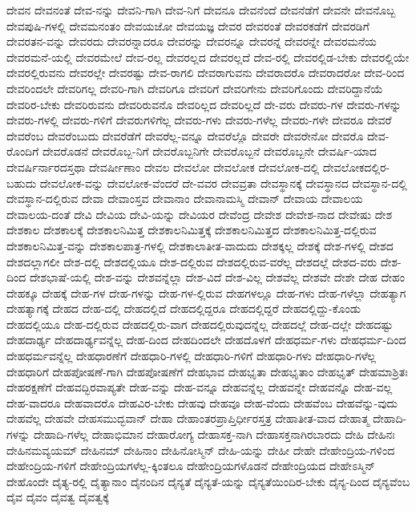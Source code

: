 {ದೇವನ
ದೇವನಂತೆ
ದೇವ-ನನ್ನು
ದೇವನಿ-ಗಾಗಿ
ದೇವ-ನಿಗೆ
ದೇವನೂ
ದೇವನೆಂದೆ
ದೇವನೆಡೆಗೆ
ದೇವನೇ
ದೇವನೊಬ್ಬ
ದೇವಪುಷಿ-ಗಳಲ್ಲಿ
ದೇವಮನಂತಂ
ದೇವಯಜೋ
ದೇವಯಜ್ಞ
ದೇವರ
ದೇವರಂತೆ
ದೇವರಕಡೆಗೆ
ದೇವರಡಿಗೆ
ದೇವರತನ-ವನ್ನು
ದೇವರದು
ದೇವರನ್ನಾದರೂ
ದೇವರನ್ನು
ದೇವರನ್ನೂ
ದೇವರನ್ನೆ
ದೇವರನ್ನೇ
ದೇವರಮನೆಯ
ದೇವರಮನೆ-ಯಲ್ಲಿ
ದೇವರಮೇಲೆ
ದೇವ-ರಲ್ಲ
ದೇವರಲ್ಲದ
ದೇವರಲ್ಲದೆ
ದೇವ-ರಲ್ಲಿ
ದೇವರಲ್ಲಿಡ-ಬೇಕು
ದೇವರಲ್ಲಿಯೇ
ದೇವರಲ್ಲಿರುವನು
ದೇವರಲ್ಲೇ
ದೇವರಷ್ಟು
ದೇವ-ರಾಗಲಿ
ದೇವರಾಗುವನು
ದೇವರಾದರೊ
ದೇವರಾದರೋ
ದೇವ-ರಿಂದ
ದೇವರಿಂದಲೇ
ದೇವರಿಗಲ್ಲ
ದೇವರಿ-ಗಾಗಿ
ದೇವರಿಗೂ
ದೇವರಿಗೆ
ದೇವರಿಗೇನು
ದೇವರಿಗೊಂದು
ದೇವರಿದ್ದಾನೆಯೆ
ದೇವರಿರ-ಬೇಕು
ದೇವರಿರುವನು
ದೇವರಿರುವನೊ
ದೇವರಿಲ್ಲದ
ದೇವರಿಲ್ಲದೆ
ದೇ-ವರು
ದೇವರು-ಗಳ
ದೇವರು-ಗಳನ್ನು
ದೇವರು-ಗಳಲ್ಲಿ
ದೇವರು-ಗಳಿಗೆ
ದೇವರುಗಳಿಗೆಲ್ಲ
ದೇವರು-ಗಳು
ದೇವರು-ಗಳೆಲ್ಲ
ದೇವರು-ಗಳೇ
ದೇವರೂ
ದೇವರೆ
ದೇವರೆಂಬ
ದೇವರೆಂಬುದು
ದೇವರೆಡೆಗೆ
ದೇವರೆಲ್ಲ-ವನ್ನೂ
ದೇವರೆಲ್ಲೊ
ದೇವರೇ
ದೇವರೇನೋ
ದೇವರೊ
ದೇವ-ರೊಂದಿಗೆ
ದೇವರೊಡನೆ
ದೇವರೊಬ್ಬ-ನಿಗೆ
ದೇವರೊಬ್ಬನಿಗೇ
ದೇವರೊಬ್ಬನೆ
ದೇವರೊಬ್ಬನೇ
ದೇವರ್ಷಿ-ಯಾದ
ದೇವರ್ಷಿರ್ನಾರದಸ್ತಥಾ
ದೇವರ್ಷೀಣಾಂ
ದೇವಲ
ದೇವಲೋ
ದೇವಲೋಕ
ದೇವಲೋಕ-ದಲ್ಲಿ
ದೇವಲೋಕದಲ್ಲಿರ-ಬಹುದು
ದೇವಲೋಕ-ವನ್ನು
ದೇವಲೋಕ-ವೆಂದರೆ
ದೇ-ವವರ
ದೇವವ್ರತಾ
ದೇವಸ್ಥಾನಕ್ಕೆ
ದೇವಸ್ಥಾನದ
ದೇವಸ್ಥಾನ-ದಲ್ಲಿ
ದೇವಸ್ಥಾನ-ದಲ್ಲಿರುವ
ದೇವಾ
ದೇವಾಂಸ್ತವ
ದೇವಾನಾಂ
ದೇವಾನಾಮಸ್ಮಿ
ದೇವಾನ್
ದೇವಾಯ
ದೇವಾಲಯ
ದೇವಾಲಯ-ದಂತೆ
ದೇವಿ
ದೇವಿಯ
ದೇವಿ-ಯನ್ನು
ದೇವಿಯರ
ದೇವೆಂದ್ರ
ದೇವೇಶ
ದೇವೇಶ-ನಾದ
ದೇವೇಷು
ದೇಶ
ದೇಶಕಾಲ
ದೇಶಕಾಲಕ್ಕೆ
ದೇಶಕಾಲನಿಮಿತ್ತ
ದೇಶಕಾಲನಿಮಿತ್ತಕ್ಕೆ
ದೇಶಕಾಲನಿಮಿತ್ತದ
ದೇಶಕಾಲನಿಮಿತ್ತ-ದಲ್ಲಿರುವ
ದೇಶಕಾಲನಿಮಿತ್ತ-ವನ್ನು
ದೇಶಕಾಲಪಾತ್ರ-ಗಳಲ್ಲಿ
ದೇಶಕಾಲಾತೀತ-ವಾದುದು
ದೇಶಕ್ಕಲ್ಲ
ದೇಶಕ್ಕೆ
ದೇಶ-ಗಳಲ್ಲಿ
ದೇಶದ
ದೇಶದಲ್ಲಾಗಲೀ
ದೇಶ-ದಲ್ಲಿ
ದೇಶದಲ್ಲಿಯೂ
ದೇಶ-ದಲ್ಲಿರುವ
ದೇಶದಲ್ಲಿರುವ-ವರೆಲ್ಲ
ದೇಶದಲ್ಲೆ
ದೇಶದ-ವರು
ದೇಶ-ದಿಂದ
ದೇಶಭಾಷೆ-ಯಲ್ಲಿ
ದೇಶ-ವನ್ನು
ದೇಶವನ್ನೆಲ್ಲಾ
ದೇಶ-ವಿದೆ
ದೇಶ-ವಿಲ್ಲ
ದೇಶವೆಲ್ಲ
ದೇಶವೇ
ದೇಶೇ
ದೇಹ
ದೇಹಂ
ದೇಹಕ್ಕೂ
ದೇಹಕ್ಕೆ
ದೇಹ-ಗಳ
ದೇಹ-ಗಳನ್ನು
ದೇಹ-ಗಳ-ಲ್ಲಿರುವ
ದೇಹಗಳಲ್ಲೂ
ದೇಹ-ಗಳು
ದೇಹ-ಗಳೆಲ್ಲಾ
ದೇಹತ್ಯಾಗ
ದೇಹತ್ಯಾಗಕ್ಕೆ
ದೇಹದ
ದೇಹ-ದಲ್ಲಿ
ದೇಹದಲ್ಲಿದೆ
ದೇಹದಲ್ಲಿದ್ದರೂ
ದೇಹದಲ್ಲಿದ್ದರೆ
ದೇಹದಲ್ಲಿದ್ದು-ಕೊಂಡು
ದೇಹದಲ್ಲಿಯೂ
ದೇಹ-ದಲ್ಲಿರುವ
ದೇಹದಲ್ಲಿರು-ವಾಗ
ದೇಹದಲ್ಲಿರುವುದನ್ನೆಲ್ಲ
ದೇಹದಲ್ಲೆ
ದೇಹ-ದಲ್ಲೇ
ದೇಹದಷ್ಟು
ದೇಹದಾರ್ಢ್ಯ
ದೇಹದಾರ್ಢ್ಯವನ್ನೆಲ್ಲ
ದೇಹ-ದಿಂದ
ದೇಹದಿಂದಲೇ
ದೇಹದೊಳಗೆ
ದೇಹಧರ್ಮ-ಗಳು
ದೇಹಧರ್ಮ-ದಿಂದ
ದೇಹಧರ್ಮವನ್ನೆಲ್ಲ
ದೇಹಧಾರಣೆಗೆ
ದೇಹಧಾರಿ-ಗಳಲ್ಲಿ
ದೇಹಧಾರಿ-ಗಳಿಗೆ
ದೇಹಧಾರಿ-ಗಳು
ದೇಹಧಾರಿ-ಗಳೆಲ್ಲ
ದೇಹಧಾರಿಗೆ
ದೇಹಪೋಷಣೆ-ಗಾಗಿ
ದೇಹಪೋಷಣೆಗೆ
ದೇಹಭಾವ
ದೇಹಭೃತಾ
ದೇಹಭೃತಾಂ
ದೇಹಭೃತ್
ದೇಹಮಾಶ್ರಿತಃ
ದೇಹರಕ್ಷಣೆಗೆ
ದೇಹವದ್ಭಿರವಾಪ್ಯತೇ
ದೇಹ-ವನ್ನು
ದೇಹ-ವನ್ನೂ
ದೇಹವನ್ನೆಲ್ಲ
ದೇಹವನ್ನೇ
ದೇಹವನ್ನೊ
ದೇಹ-ವಲ್ಲ
ದೇಹ-ವಾದರೂ
ದೇಹವಾದರೊ
ದೇಹವಿರ-ಬೇಕು
ದೇಹವು
ದೇಹವೂ
ದೇಹ-ವೆಂದು
ದೇಹವೆಂಬ
ದೇಹವೆನ್ನು-ವುದು
ದೇಹವೆಲ್ಲ
ದೇಹವೇ
ದೇಹಸಮುದ್ಭವಾನ್
ದೇಹಾ
ದೇಹಾಂತರಪ್ರಾಪ್ತಿರ್ಧೀರಸ್ತತ್ರ
ದೇಹಾತೀತ-ವಾದ
ದೇಹಾತ್ಮ
ದೇಹಾದಿ-ಗಳನ್ನು
ದೇಹಾದಿ-ಗಳೆಲ್ಲ
ದೇಹಾಭಿಮಾನ
ದೇಹಾರೋಗ್ಯ
ದೇಹಾಸಕ್ತ-ನಾಗಿ
ದೇಹಾಸಕ್ತನಾಗಿರಬಾರದು
ದೇಹಿ
ದೇಹಿನಃ
ದೇಹಿನಮವ್ಯಯಮ್
ದೇಹಿನಮ್
ದೇಹಿನಾಂ
ದೇಹಿನೋಸ್ಮಿನ್
ದೇಹಿ-ಯನ್ನು
ದೇಹೀ
ದೇಹೇ
ದೇಹೇಂದ್ರಿಯ-ಗಳಿಂದ
ದೇಹೇಂದ್ರಿಯ-ಗಳಿಗೆ
ದೇಹೇಂದ್ರಿಯಗಳೆಲ್ಲ-ಕ್ಕಿಂತಲೂ
ದೇಹೇಂದ್ರಿಯಗಳೊಡನೆ
ದೇಹೇಂದ್ರಿಯದ
ದೇಹೇಽಸ್ಮಿನ್
ದೇಹೊಂದೇ
ದೈತ್ಯ-ರಲ್ಲಿ
ದೈತ್ಯಾನಾಂ
ದೈನಂದಿನ
ದೈನ್ಯತೆ
ದೈನ್ಯತೆ-ಯನ್ನು
ದೈನ್ಯತೆಯಿಂದಿರ-ಬೇಕು
ದೈನ್ಯ-ದಿಂದ
ದೈನ್ಯವೆಂಬ
ದೈವ
ದೈವಂ
ದೈವತ್ವ
ದೈವತ್ವಕ್ಕೆ
}
